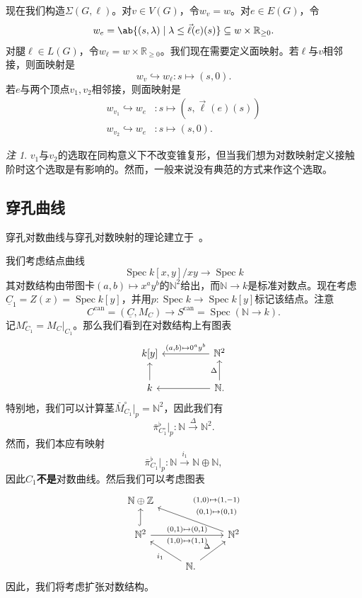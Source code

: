 \documentclass{amsart}
\theoremstyle{definition}
\theoremstyle{remark}
\newtheorem{rmk}[thm]{注}
\theoremstyle{plain}
\theoremstyle{definition}
\theoremstyle{remark}
\newcommand{\N}{\mathbb{N}}
\newcommand{\R}{\mathbb{R}}
\newcommand{\Z}{\mathbb{Z}}
\newcommand{\on}[1]{\operatorname{#1}}
\newcommand{\ul}[1]{\underline{#1}}
\newcommand{\1}{\mathbf{1}}
\newcommand{\2}{\mathbf{2}}
\newcommand{\3}{\mathbf{3}}
\DeclareMathOperator{\Spec}{Spec}
\begin{document}
现在我们构造\(\Sigma(G, \ell)\)。对\(v \in V(G)\)，令\(w_v = w\)。对\(e \in E(G)\)，令
\[ w_e = \ab\{ (s, \lambda) \mid \lambda \leq \vec{\ell}(e)(s) \} \subseteq w \times \R_{\geq 0}. \]
对腿\(\ell \in L(G)\)，令\(w_{\ell} = w \times \R_{\geq 0}\)。我们现在需要定义面映射。若\(\ell\)与\(v\)相邻接，则面映射是
\[ w_v \hookrightarrow w_{\ell} \colon s \mapsto (s, 0). \]
若\(e\)与两个顶点\(v_1, v_2\)相邻接，则面映射是
\begin{align*}
    w_{v_1} \hookrightarrow w_e &\colon s \mapsto (s, \vec{\ell}(e)(s)) \\
    w_{v_2} \hookrightarrow w_e & \colon s \mapsto (s, 0).
\end{align*}
\begin{rmk}
    \(v_1\)与\(v_2\)的选取在同构意义下不改变锥复形，但当我们想为对数映射定义接触阶时这个选取是有影响的。然而，一般来说没有典范的方式来作这个选取。
\end{rmk}

\subsection{穿孔曲线}%
\label{sub:Punctured curves}

穿孔对数曲线与穿孔对数映射的理论建立于~\cite{ACGS2025}。

我们考虑结点曲线
\[ \Spec k[x,y]/xy \to \Spec k \]
其对数结构由带图卡\((a,b) \mapsto x^a y^b\)的\(\N^2\)给出，而\(\N \to k\)是标准对数点。现在考虑\(\ul{C}_1 = Z(x) = \Spec k[y]\)，并用\(p \colon \Spec k \to \Spec k[y]\)标记该结点。注意
\[ C^{\on{can}} = (\ul{C}, M_C) \to S^{\on{can}} = \Spec(\N \to k). \]
记\(M_{C_1}^{\circ} = M_C|_{C_1}\)。那么我们看到在对数结构上有图表
\begin{equation*}
\begin{tikzcd}
    k[y] & & \N^2 \ar{ll}[swap]{(a,b) \mapsto 0^a y^b} \\
    k \ar{u} & & \N \ar{ll} \ar{u}{\Delta}.
\end{tikzcd}
\end{equation*}
特别地，我们可以计算茎\(\bar{M}_{C_1}^{\circ}|_p = \N^2\)，因此我们有
\[ \bar{\pi}_{C_1^{\circ}}^{\flat} |_p \colon \N \xrightarrow{\Delta} \N^2. \]
然而，我们本应有映射
\[ \bar{\pi}^{\flat}_{C_1}|_p \colon \N \xrightarrow{i_1} \N \oplus \N, \]
因此\(C_1\)\textbf{不是}对数曲线。然后我们可以考虑图表
\begin{equation*}
\begin{tikzcd}
    \N \oplus \Z \\
    \N^2 \ar[hookrightarrow]{u} \ar{rr}{(0,1)\mapsto (0,1)}[swap]{(1,0)\mapsto (1,1)} & & \N^2 \ar{ull}[swap]{\Vectorstack{{(1,0)\mapsto(1,-1)} {(0,1)\mapsto(0,1)}}} \\
    & \N \ar{ul}{i_1} \ar{ur}{\Delta}.
\end{tikzcd}
\end{equation*}
因此，我们将考虑扩张对数结构。
\end{document}
